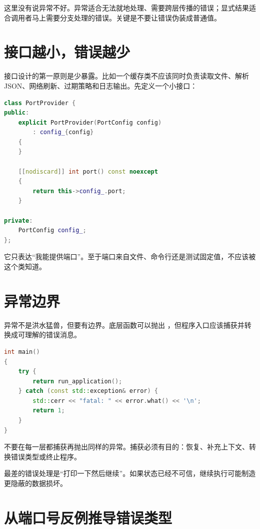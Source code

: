 这里没有说异常不好。异常适合无法就地处理、需要跨层传播的错误；显式结果适合调用者马上需要分支处理的错误。关键是不要让错误伪装成普通值。

\section{接口越小，错误越少}

接口设计的第一原则是少暴露。比如一个缓存类不应该同时负责读取文件、解析 JSON、网络刷新、过期策略和日志输出。先定义一个小接口：

\begin{lstlisting}[language=C++,caption={小接口降低耦合}]
class PortProvider {
public:
    explicit PortProvider(PortConfig config)
        : config_{config}
    {
    }

    [[nodiscard]] int port() const noexcept
    {
        return this->config_.port;
    }

private:
    PortConfig config_;
};
\end{lstlisting}

它只表达“我能提供端口”。至于端口来自文件、命令行还是测试固定值，不应该被这个类知道。

\section{异常边界}

异常不是洪水猛兽，但要有边界。底层函数可以抛出 ，但程序入口应该捕获并转换成可理解的错误消息。

\begin{lstlisting}[language=C++,caption={程序入口处建立异常边界}]
int main()
{
    try {
        return run_application();
    } catch (const std::exception& error) {
        std::cerr << "fatal: " << error.what() << '\n';
        return 1;
    }
}
\end{lstlisting}

不要在每一层都捕获再抛出同样的异常。捕获必须有目的：恢复、补充上下文、转换错误类型或终止程序。

\begin{warningbox}
最差的错误处理是“打印一下然后继续”。如果状态已经不可信，继续执行可能制造更隐蔽的数据损坏。
\end{warningbox}

\section{从端口号反例推导错误类型}

